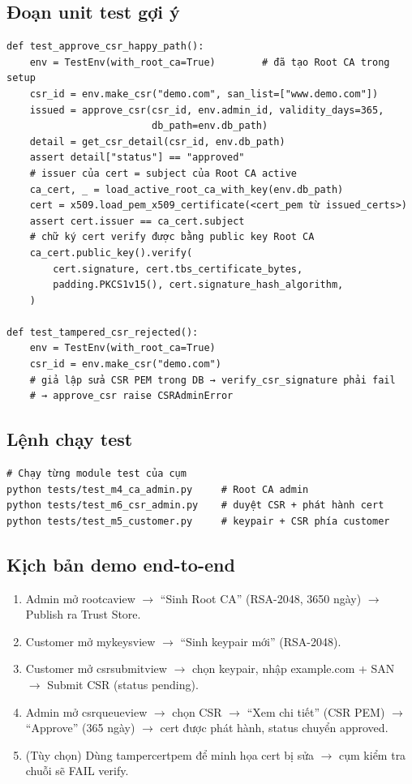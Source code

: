 \documentclass[12pt,a4paper]{article}
\newcommand{\code}[1]{{\ttfamily\small\def\_{\textunderscore\discretionary{}{}{}}#1}}
\begin{document}
\subsection{Đoạn unit test gợi ý}

\begin{Verbatim}
def test_approve_csr_happy_path():
    env = TestEnv(with_root_ca=True)        # đã tạo Root CA trong setup
    csr_id = env.make_csr("demo.com", san_list=["www.demo.com"])
    issued = approve_csr(csr_id, env.admin_id, validity_days=365,
                         db_path=env.db_path)
    detail = get_csr_detail(csr_id, env.db_path)
    assert detail["status"] == "approved"
    # issuer của cert = subject của Root CA active
    ca_cert, _ = load_active_root_ca_with_key(env.db_path)
    cert = x509.load_pem_x509_certificate(<cert_pem từ issued_certs>)
    assert cert.issuer == ca_cert.subject
    # chữ ký cert verify được bằng public key Root CA
    ca_cert.public_key().verify(
        cert.signature, cert.tbs_certificate_bytes,
        padding.PKCS1v15(), cert.signature_hash_algorithm,
    )

def test_tampered_csr_rejected():
    env = TestEnv(with_root_ca=True)
    csr_id = env.make_csr("demo.com")
    # giả lập sửa CSR PEM trong DB → verify_csr_signature phải fail
    # → approve_csr raise CSRAdminError
\end{Verbatim}

\subsection{Lệnh chạy test}

\begin{Verbatim}
# Chạy từng module test của cụm
python tests/test_m4_ca_admin.py     # Root CA admin
python tests/test_m6_csr_admin.py    # duyệt CSR + phát hành cert
python tests/test_m5_customer.py     # keypair + CSR phía customer
\end{Verbatim}

\subsection{Kịch bản demo end-to-end}

\begin{enumerate}
  \item Admin mở \code{root\_ca\_view} $\to$ \enquote{Sinh Root CA} (RSA-2048,
        3650 ngày) $\to$ Publish ra Trust Store.
  \item Customer mở \code{my\_keys\_view} $\to$ \enquote{Sinh keypair mới}
        (RSA-2048).
  \item Customer mở \code{csr\_submit\_view} $\to$ chọn keypair, nhập
        \code{example.com} + SAN $\to$ Submit CSR (status \code{pending}).
  \item Admin mở \code{csr\_queue\_view} $\to$ chọn CSR $\to$ \enquote{Xem chi
        tiết} (CSR PEM) $\to$ \enquote{Approve} (365 ngày) $\to$ cert được phát
        hành, status chuyển \code{approved}.
  \item (Tùy chọn) Dùng \code{tamper\_cert\_pem} để minh họa cert bị sửa $\to$
        cụm kiểm tra chuỗi sẽ FAIL verify.
\end{enumerate}
\end{document}
